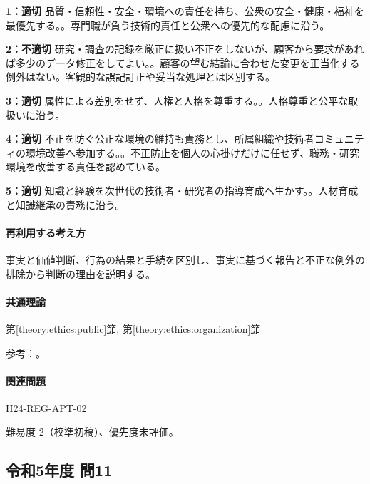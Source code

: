 \noindent\textbf{1：適切} 品質・信頼性・安全・環境への責任を持ち、公衆の安全・健康・福祉を最優先する。。専門職が負う技術的責任と公衆への優先的な配慮に沿う。\par

\noindent\textbf{2：不適切} 研究・調査の記録を厳正に扱い不正をしないが、顧客から要求があれば多少のデータ修正をしてよい。。顧客の望む結論に合わせた変更を正当化する例外はない。客観的な誤記訂正や妥当な処理とは区別する。\par

\noindent\textbf{3：適切} 属性による差別をせず、人権と人格を尊重する。。人格尊重と公平な取扱いに沿う。\par

\noindent\textbf{4：適切} 不正を防ぐ公正な環境の維持も責務とし、所属組織や技術者コミュニティの環境改善へ参加する。。不正防止を個人の心掛けだけに任せず、職務・研究環境を改善する責任を認めている。\par

\noindent\textbf{5：適切} 知識と経験を次世代の技術者・研究者の指導育成へ生かす。。人材育成と知識継承の責務に沿う。\par

\paragraph{再利用する考え方} 事実と価値判断、行為の結果と手続を区別し、事実に基づく報告と不正な例外の排除から判断の理由を説明する。

\paragraph{共通理論} \hyperref[theory:ethics:public]{第\ref*{theory:ethics:public}節}, \hyperref[theory:ethics:organization]{第\ref*{theory:ethics:organization}節}

\par 参考：\cite{ipej_ethics2011,mext_misconduct2014}。

\paragraph{関連問題} \hyperref[q:h24-reg-apt-02]{H24-REG-APT-02}

\par 難易度 2（校準初稿）、優先度未評価。

\subsection{令和5年度 問11}
\label{q:r05-reg-apt-11}

